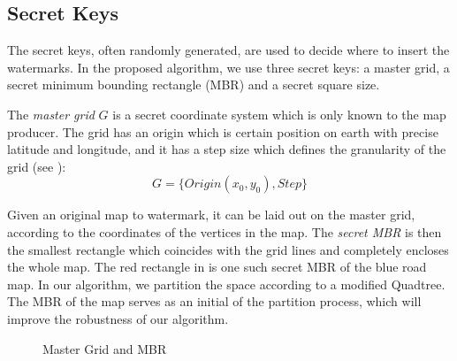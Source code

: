 \subsection{Secret Keys}
The secret keys, often randomly generated, are used to decide where to insert the 
watermarks. In the proposed algorithm, we use three secret keys: 
a master grid, a secret minimum bounding rectangle (MBR) and
a secret square size. 

The {\em master grid} $G$ is a secret coordinate system which is only known
to the map producer. The grid has an origin which is certain position on earth
with precise latitude and longitude, and it has a step size which defines
the granularity of the grid (see ):
\[G=\{Origin(x_0, y_0), Step\}\]

Given an original map to watermark, it can be laid out on the master grid, 
according to the coordinates of the vertices in the map. 
The {\em secret MBR} is then the smallest
rectangle which coincides with the grid lines and completely 
encloses the whole map. The red rectangle in  
is one such secret MBR of the blue road map. 
In our algorithm, we partition the space according to a modified Quadtree. 
The MBR of the map serves as an initial of the partition process,
which will improve the robustness of our algorithm.  

\begin{figure}[th]
\centering
{}
\caption{Master Grid and MBR}
\label{fig:grid}
\end{figure}

